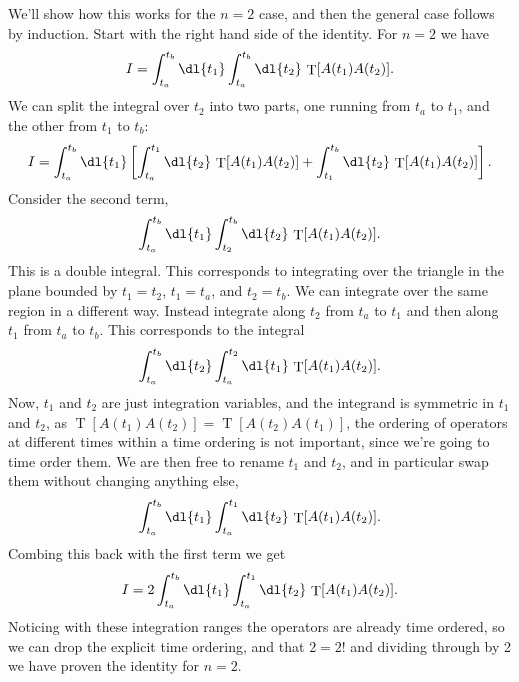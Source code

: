 \documentclass[fleqn]{NotesClass}
\DeclareMathOperator{\timeOrdering}{T}
\begin{document}
    We'll show how this works for the \(n = 2\) case, and then the general case follows by induction.
    Start with the right hand side of the identity.
    For \(n = 2\) we have
    \begin{equation}
        I = \int_{t_a}^{t_b} \dl{t_1} \int_{t_a}^{t_b} \dl{t_2} \, \timeOrdering[A(t_1)A(t_2)].
    \end{equation}
    We can split the integral over \(t_2\) into two parts, one running from \(t_a\) to \(t_1\), and the other from \(t_1\) to \(t_b\):
    \begin{equation}
        I = \int_{t_a}^{t_b} \dl{t_1} \left[ \int_{t_a}^{t_1} \dl{t_2} \, \timeOrdering[A(t_1)A(t_2)] + \int_{t_1}^{t_b} \dl{t_2} \, \timeOrdering[A(t_1) A(t_2)] \right].
    \end{equation}
    Consider the second term,
    \begin{equation}
        \int_{t_a}^{t_b} \dl{t_1} \int_{t_2}^{t_b} \dl{t_2} \, \timeOrdering[A(t_1) A(t_2)].
    \end{equation}
    This is a double integral.
    This corresponds to integrating over the triangle in the plane bounded by \(t_1 = t_2\), \(t_1 = t_a\), and \(t_2 = t_b\).
    We can integrate over the same region in a different way.
    Instead integrate along \(t_2\) from \(t_a\) to \(t_1\) and then along \(t_1\) from \(t_a\) to \(t_b\).
    This corresponds to the integral
    \begin{equation}
        \int_{t_a}^{t_b} \dl{t_2} \int_{t_a}^{t_2} \dl{t_1} \, \timeOrdering[A(t_1)A(t_2)].
    \end{equation}
    Now, \(t_1\) and \(t_2\) are just integration variables, and the integrand is symmetric in \(t_1\) and \(t_2\), as \(\timeOrdering[A(t_1)A(t_2)] = \timeOrdering[A(t_2)A(t_1)]\), the ordering of operators at different times within a time ordering is not important, since we're going to time order them.
    We are then free to rename \(t_1\) and \(t_2\), and in particular swap them without changing anything else,
    \begin{equation}
        \int_{t_a}^{t_b} \dl{t_1} \int_{t_a}^{t_1} \dl{t_2} \, \timeOrdering[A(t_1) A(t_2)].
    \end{equation}
    Combing this back with the first term we get
    \begin{equation}
        I = 2 \int_{t_a}^{t_b} \dl{t_1} \int_{t_a}^{t_1} \dl{t_2} \, \timeOrdering[A(t_1)A(t_2)].
    \end{equation}
    Noticing with these integration ranges the operators are already time ordered, so we can drop the explicit time ordering, and that \(2 = 2!\) and dividing through by 2 we have proven the identity for \(n = 2\).
    
\end{document}
